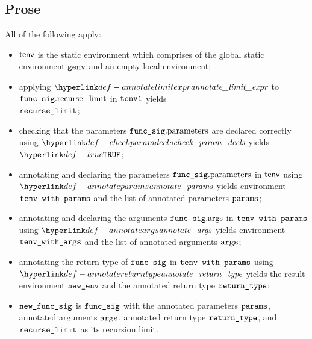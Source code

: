 \subsection{Prose}
All of the following apply:
\begin{itemize}
  \item $\textsf{tenv}$ is the static environment which comprises of the global static environment $\texttt{genv}$ and an empty local environment;
  \item applying $\annotatelimitexpr$ to $\texttt{func\_sig}.\text{recurse\_limit}$ in $\texttt{tenv1}$ yields \\
        $\texttt{recurse\_limit}$\ProseOrTypeError;
  \item checking that the parameters $\texttt{func\_sig}.\text{parameters}$ are declared correctly using $\checkparamdecls$ yields $\True$\ProseOrTypeError;
  \item annotating and declaring the parameters $\texttt{func\_sig}.\text{parameters}$ in $\textsf{tenv}$ using \\ $\annotateparams$ yields environment $\texttt{tenv\_with\_params}$ and the list of annotated parameters $\texttt{params}$\ProseOrTypeError;
  \item annotating and declaring the arguments $\texttt{func\_sig}.\text{args}$ in $\texttt{tenv\_with\_params}$ using $\annotateargs$ yields environment $\texttt{tenv\_with\_args}$ and the list of annotated arguments $\texttt{args}$\ProseOrTypeError;
  \item annotating the return type of $\texttt{func\_sig}$ in $\texttt{tenv\_with\_params}$ using \\ $\annotatereturntype$ yields the result environment $\texttt{new\_env}$ and the annotated return type $\texttt{return\_type}$\ProseOrTypeError;
  \item $\texttt{new\_func\_sig}$ is $\texttt{func\_sig}$ with the annotated parameters $\texttt{params}$, annotated arguments $\texttt{args}$, annotated return type $\texttt{return\_type}$,
        and $\texttt{recurse\_limit}$ as its recursion limit.
\end{itemize}

